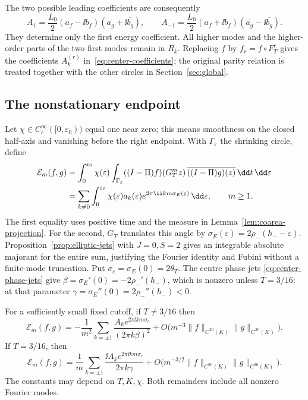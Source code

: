 The two possible leading coefficients are consequently
\[
 A_1=\frac{L_0}{2}(a_f-\ii b_f)
                  (\overline{a_g}+\ii\overline{b_g}),\qquad
 A_{-1}=\frac{L_0}{2}(a_f+\ii b_f)
                  (\overline{a_g}-\ii\overline{b_g}).
\]
They determine only the first energy coefficient.  All higher modes and
the higher-order parts of the two first modes remain in $R_k$.
Replacing $f$ by $f_r=f\circ F_T^r$ gives the coefficients
$A_k^{(r)}$ in~\eqref{eq:center-coefficients}; the original parity
relation is treated together with the other circles in
Section~\ref{sec:global}.

\subsection{The nonstationary endpoint}

Let $\chi\in C_c^\infty([0,\varepsilon_0))$ equal one near zero; this
means smoothness on the closed half-axis and vanishing before the right
endpoint.  With $\Gamma_\varepsilon$ the shrinking circle, define
\begin{align}
 \mathcal E_m(f,g)
 &=\int_0^{\varepsilon_0}\chi(\varepsilon)
   \int_{\Gamma_\varepsilon}
   ((I-\Pi)f)(G_T^mz)\,
   \overline{((I-\Pi)g)(z)}\,\dd t\,\dd\varepsilon
   \notag\\
 &=\sum_{k\ne0}\int_0^{\varepsilon_0}
   \chi(\varepsilon)a_k(\varepsilon)
   e^{2\pi\ii km\sigma_E(\varepsilon)}\,\dd\varepsilon,
 \qquad m\geq1.\label{ell:fourier-integral}
\end{align}
The first equality uses positive time and the measure in
Lemma~\ref{lem:coarea-projection}.  For the second, $G_T$ translates this
angle by $\sigma_E(\varepsilon)=2\rho_-(h_--\varepsilon)$.
Proposition~\ref{prop:elliptic-jets} with $J=0,S=2$ gives an integrable
absolute majorant for the entire sum, justifying the Fourier identity
and Fubini without a finite-mode truncation.  Put
$\sigma_c=\sigma_E(0)=2\theta_T$.  The centre phase jets
\eqref{eq:center-phase-jets} give $\beta=\sigma_E'(0)=-2\rho_-'(h_-)$,
which is nonzero unless $T=3/16$; at that parameter
$\gamma=\sigma_E''(0)=2\rho_-''(h_-)<0$.

\begin{proposition}\label{prop:elliptic-endpoints}
For a sufficiently small fixed cutoff, if $T\ne3/16$ then
\begin{equation}\label{ell:ordinary-endpoint}
 \mathcal E_m(f,g)
 =-\frac1{m^2}\sum_{k=\pm1}
   \frac{A_ke^{2\pi\ii km\sigma_c}}{(2\pi k\beta)^2}
   +O\bigl(m^{-3}\|f\|_{C^{20}(K)}\|g\|_{C^{20}(K)}\bigr).
\end{equation}
If $T=3/16$, then
\begin{equation}\label{ell:quadratic-endpoint}
 \mathcal E_m(f,g)
 =\frac1m\sum_{k=\pm1}
   \frac{\ii A_ke^{2\pi\ii km\sigma_c}}{2\pi k\gamma}
   +O\bigl(m^{-3/2}\|f\|_{C^{20}(K)}\|g\|_{C^{20}(K)}\bigr).
\end{equation}
The constants may depend on $T,K,\chi$.  Both remainders include all
nonzero Fourier modes.
\end{proposition}


